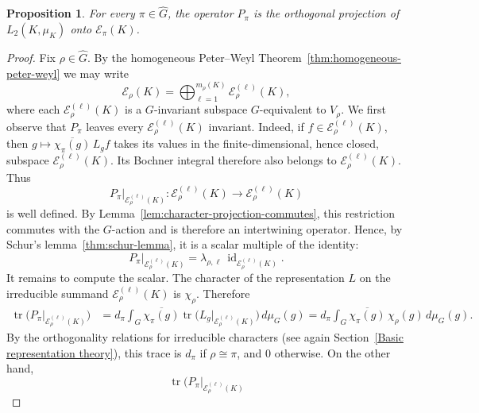\documentclass[11pt,showkeys]{amsart}
\newtheorem{proposition}[theorem]{Proposition}
\begin{document}
\begin{proposition}
\label{prop:character-projection}
For every \(\pi\in\widehat G\), the operator \(P_\pi\) is the orthogonal
projection of \(L_2(K,\mu_K)\) onto \(\mathcal E_\pi(K)\).
\end{proposition}

\begin{proof}
Fix \(\rho\in\widehat G\). By the homogeneous Peter--Weyl Theorem~\ref{thm:homogeneous-peter-weyl} we may
write
\[
        \mathcal E_\rho(K)
        =
        \bigoplus_{\ell=1}^{m_\rho(K)}
        \mathcal E_\rho^{(\ell)}(K),
\]
where each \(\mathcal E_{\rho}^{(\ell)}(K)\) is a \(G\)-invariant
subspace \(G\)-equivalent to \(V_\rho\). We first observe that
\(P_\pi\) leaves every \(\mathcal E_{\rho}^{(\ell)}(K)\) invariant.
Indeed, if \(f\in\mathcal E_{\rho}^{(\ell)}(K)\), then
\(
    g\longmapsto
    \overline{\chi_\pi(g)}\,L_gf
\)
takes its values in the finite-dimensional, hence closed, subspace
\(\mathcal E_{\rho}^{(\ell)}(K)\). Its Bochner integral therefore also
belongs to \(\mathcal E_{\rho}^{(\ell)}(K)\). Thus
\[
    P_\pi\big|_{\mathcal E_{\rho}^{(\ell)}(K)}
    :
    \mathcal E_{\rho}^{(\ell)}(K)
    \longrightarrow
    \mathcal E_{\rho}^{(\ell)}(K)
\]
is well defined. By
Lemma~\ref{lem:character-projection-commutes}, this restriction
commutes with the \(G\)-action and is therefore an intertwining
operator.
Hence, by Schur's lemma~\ref{thm:schur-lemma}, it is a scalar
multiple of the identity:
\[
        P_\pi|_{\mathcal E_\rho^{(\ell)}(K)}
        =
        \lambda_{\rho,\ell}\,
        \operatorname{id}_{\mathcal E_\rho^{(\ell)}(K)} .
\]
It remains to compute the scalar. The character of the representation
\(L\) on the irreducible summand
\(\mathcal E_\rho^{(\ell)}(K)\) is \(\chi_\rho\). Therefore
\[
\begin{aligned}
        \operatorname{tr}
        \bigl(
        P_\pi|_{\mathcal E_\rho^{(\ell)}(K)}
        \bigr)
        &=
        d_\pi
        \int_G
        \overline{\chi_\pi(g)}
        \operatorname{tr}
        \bigl(
        L_g|_{\mathcal E_\rho^{(\ell)}(K)}
        \bigr)
        \,d\mu_G(g)                                              =
        d_\pi
        \int_G
        \overline{\chi_\pi(g)}\,\chi_\rho(g)\,d\mu_G(g).
\end{aligned}
\]
By the orthogonality relations for irreducible characters (see again Section~\ref{Basic representation theory}), this trace is
\(d_\pi\) if \(\rho\cong\pi\), and \(0\) otherwise. On the other hand,
\[
        \operatorname{tr}
        \bigl(
        P_\pi|_{\mathcal E_\rho^{(\ell)}(K)}
\]
\end{proof}
\end{document}
